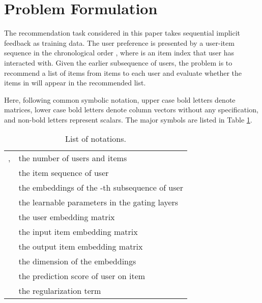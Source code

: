 \documentclass[sigconf]{acmart}
\begin{document}
\section{Problem Formulation}
The recommendation task considered in this paper takes sequential implicit feedback as training data. The user preference is presented by a user-item sequence in the chronological order , where  is an item index that user  has interacted with. Given the earlier subsequence  of  users, the problem is to recommend a list of items from  items to each user and evaluate whether the items in  will appear in the recommended list.

Here, following common symbolic notation, upper case bold letters denote matrices, lower case bold letters denote column vectors without any specification, and non-bold letters represent scalars. The major symbols are listed in Table \ref{tab:notations}.

\begin{table}[ht]
\centering
\caption{List of notations.}
\label{tab:notations}
\begin{tabular}{ll}
 \hline
,  & the number of users and items \\
 & the item sequence of user  \\
 & the embeddings of the -th subsequence of user  \\
 & the learnable parameters in the gating layers \\
 & the user embedding matrix \\
 & the input item embedding matrix \\
 & the output item embedding matrix \\
 & the dimension of the embeddings \\
 & the prediction score of user  on item  \\
 & the regularization term \\ \hline
\end{tabular}
\vspace{-0.3cm}
\end{table}
\end{document}
